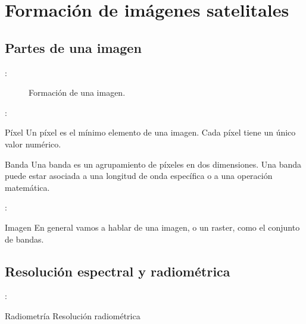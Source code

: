 \section{Formación de imágenes satelitales}
\subsection{Partes de una imagen}

\begin{frame}{\secname : \subsecname}
  \begin{figure}
    \centering
    \caption{Formación de una imagen.}
    \label{}
  \end{figure}
\end{frame}

\begin{frame}{\secname : \subsecname}
\begin{block}{Píxel}
  Un píxel es el mínimo elemento de una imagen. Cada píxel tiene un único valor numérico.
\end{block}\pause
\begin{block}{Banda}
  Una banda es un agrupamiento de píxeles en dos dimensiones. Una banda puede estar asociada a una longitud de onda específica o a una operación matemática.
\end{block}
\end{frame}


\begin{frame}{\secname : \subsecname}
  \begin{block}{Imagen}
    En general vamos a hablar de una imagen, o un raster, como el conjunto de bandas.
  \end{block}
\end{frame}

\subsection{Resolución espectral y radiométrica}

\begin{frame}{\secname : \subsecname}
  \begin{block}{Radiometría}
    Resolución radiométrica
  \end{block}
\end{frame}

